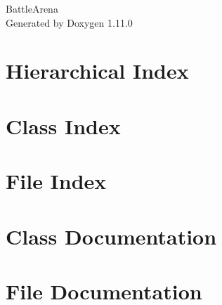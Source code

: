 \documentclass[twoside]{book}
\newcommand{\+}{\discretionary{\mbox{\scriptsize$\hookleftarrow$}}{}{}}
\newcommand{\clearemptydoublepage}{%
    \newpage{\pagestyle{empty}\cleardoublepage}%
  }
\begin{document}
  \raggedbottom
    \hypersetup{pageanchor=false,
                bookmarksnumbered=true,
                pdfencoding=unicode
               }
  \begin{titlepage}
  \vspace*{7cm}
  \begin{center}%
  {\Large Battle\+Arena}\\
  \vspace*{1cm}
  {\large Generated by Doxygen 1.11.0}\\
  \end{center}
  \end{titlepage}
  \clearemptydoublepage
  \tableofcontents
  \clearemptydoublepage
  \hypersetup{pageanchor=true}
\chapter{Hierarchical Index}

\chapter{Class Index}

\chapter{File Index}

\chapter{Class Documentation}









\chapter{File Documentation}
































  \backmatter
  \newpage
  \clearemptydoublepage
  \printindex
\end{document}
